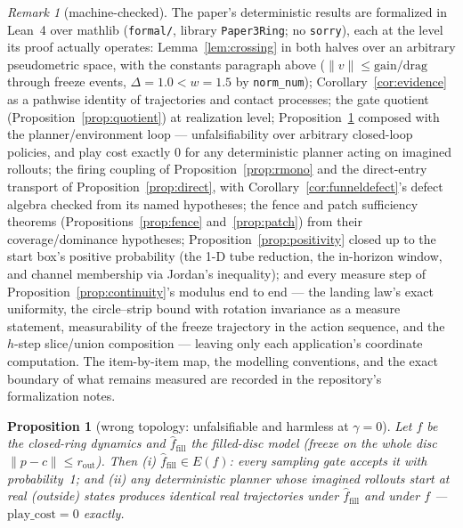 \documentclass[11pt]{article}
\newtheorem{proposition}{Proposition}
\theoremstyle{remark}
\newtheorem{remark}{Remark}
\begin{document}
\begin{remark}[machine-checked]
The paper's deterministic results are formalized in Lean~4 over mathlib
(\texttt{formal/}, library \texttt{Paper3Ring}; no \texttt{sorry}), each at
the level its proof actually operates: Lemma~\ref{lem:crossing} in both
halves over an arbitrary pseudometric space, with the constants paragraph
above ($\lVert v \rVert \le \mathrm{gain}/\mathrm{drag}$ through freeze
events, $\Delta = 1.0 < w = 1.5$ by \texttt{norm\_num});
Corollary~\ref{cor:evidence} as a pathwise identity of trajectories and
contact processes; the gate quotient (Proposition~\ref{prop:quotient}) at
realization level; Proposition~\ref{prop:harmless} composed with the
planner/environment loop --- unfalsifiability over arbitrary closed-loop
policies, and play cost exactly $0$ for any deterministic planner acting
on imagined rollouts; the firing coupling of
Proposition~\ref{prop:rmono} and the direct-entry transport of
Proposition~\ref{prop:direct}, with
Corollary~\ref{cor:funneldefect}'s defect algebra checked from its named
hypotheses; the fence and patch sufficiency theorems
(Propositions~\ref{prop:fence} and~\ref{prop:patch}) from their
coverage/dominance hypotheses; Proposition~\ref{prop:positivity} closed up
to the start box's positive probability (the 1-D tube reduction, the
in-horizon window, and channel membership via Jordan's inequality); and
every measure step of Proposition~\ref{prop:continuity}'s modulus end to
end --- the landing law's exact uniformity, the circle--strip bound with
rotation invariance as a measure statement, measurability of the freeze
trajectory in the action sequence, and the $h$-step slice/union
composition --- leaving only each application's coordinate computation.
The item-by-item map, the modelling conventions, and the exact boundary of
what remains measured are recorded in the repository's formalization
notes.
\end{remark}

\begin{proposition}[wrong topology: unfalsifiable and harmless at $\gamma = 0$]
\label{prop:harmless}
Let $f$ be the closed-ring dynamics and $\hat f_{\mathrm{fill}}$ the
filled-disc model (freeze on the whole disc
$\lVert p - c \rVert \le r_{\mathrm{out}}$). Then (i)
$\hat f_{\mathrm{fill}} \in E(f)$: every sampling gate accepts it with
probability~1; and (ii) any deterministic planner whose imagined rollouts
start at real (outside) states produces \emph{identical} real trajectories
under $\hat f_{\mathrm{fill}}$ and under $f$ ---
$\mathrm{play\_cost} = 0$ exactly.
\end{proposition}
\end{document}
